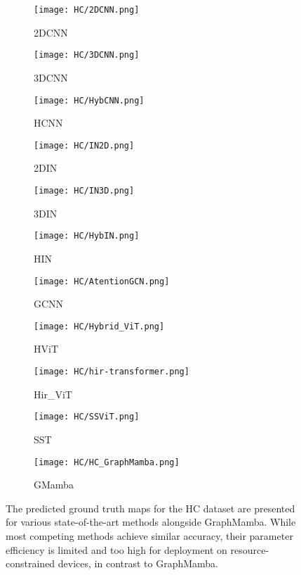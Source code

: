 \documentclass[journal]{IEEEtran}
\begin{document}
\begin{figure*}[!htb]
    \centering
        \begin{subfigure}{0.085\textwidth}
            \texttt{[image: HC/2DCNN.png]}
            \caption{2DCNN}
        \end{subfigure}
        \begin{subfigure}{0.085\textwidth}
            \centering
            \texttt{[image: HC/3DCNN.png]}
            \caption{3DCNN}
        \end{subfigure}
        \begin{subfigure}{0.085\textwidth}
            \centering
            \texttt{[image: HC/HybCNN.png]}
            \caption{HCNN}
        \end{subfigure}
        \begin{subfigure}{0.085\textwidth}
            \centering
            \texttt{[image: HC/IN2D.png]}
            \caption{2DIN}
        \end{subfigure}
        \begin{subfigure}{0.085\textwidth}
            \centering
            \texttt{[image: HC/IN3D.png]}
            \caption{3DIN}
        \end{subfigure}
        \begin{subfigure}{0.085\textwidth}
            \centering
            \texttt{[image: HC/HybIN.png]}
            \caption{HIN}
        \end{subfigure}
        \begin{subfigure}{0.085\textwidth}
            \centering
            \texttt{[image: HC/AtentionGCN.png]}
            \caption{GCNN}
        \end{subfigure}
        \begin{subfigure}{0.085\textwidth}
            \centering
            \texttt{[image: HC/Hybrid\_ViT.png]}
            \caption{HViT}
        \end{subfigure}
        \begin{subfigure}{0.085\textwidth}
            \centering
            \texttt{[image: HC/hir-transformer.png]}
            \caption{Hir\_ViT}
        \end{subfigure}
        \begin{subfigure}{0.085\textwidth}
            \centering
            \texttt{[image: HC/SSViT.png]}
            \caption{SST}
        \end{subfigure}
        \begin{subfigure}{0.085\textwidth}
            \centering
            \texttt{[image: HC/HC\_GraphMamba.png]}
            \caption{GMamba}
        \end{subfigure}
    \caption{The predicted ground truth maps for the HC dataset are presented for various state-of-the-art methods alongside GraphMamba. While most competing methods achieve similar accuracy, their parameter efficiency is limited and too high for deployment on resource-constrained devices, in contrast to GraphMamba.}
    \label{fig:HC_results}
\end{figure*}
\end{document}
